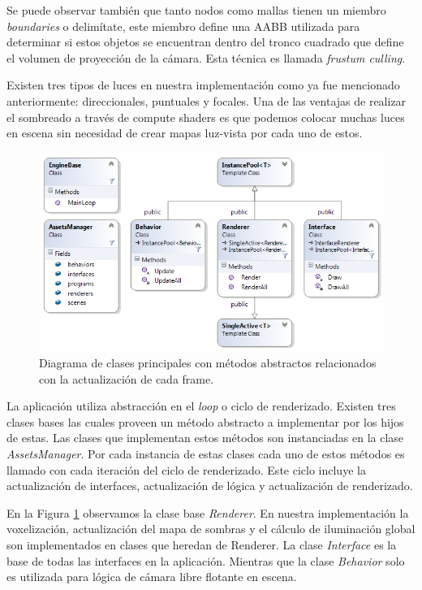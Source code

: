 Se puede observar también que tanto nodos como mallas tienen un miembro \emph{boundaries} o delimítate, este miembro define una \ac{AABB} utilizada para determinar si estos objetos se encuentran dentro del tronco cuadrado que define el volumen de proyección de la cámara. Esta técnica es llamada \emph{frustum culling}. 

Existen tres tipos de luces en nuestra implementación como ya fue mencionado anteriormente: direccionales, puntuales y focales. Una de las ventajas de realizar el sombreado a través de compute shaders es que podemos colocar muchas luces en escena sin necesidad de crear mapas luz-vista por cada uno de estos.

\begin{figure}[H]
	\centering
	\captionsetup{justification=centering}
	\includegraphics[width=\linewidth]{media/ClassDiagram.png}
	\caption{Diagrama de clases principales con métodos abstractos relacionados con la actualización de cada frame.}
	\label{fig:frame_classes}
\end{figure}

La aplicación utiliza abstracción en el \emph{loop} o ciclo de renderizado. Existen tres clases bases las cuales proveen un método abstracto a implementar por los hijos de estas. Las clases que implementan estos métodos son instanciadas en la clase \emph{AssetsManager}. Por cada instancia de estas clases cada uno de estos métodos es llamado con cada iteración del ciclo de renderizado. Este ciclo incluye la actualización de interfaces, actualización de lógica y actualización de renderizado.

En la Figura \ref{fig:frame_classes} observamos la clase base \emph{Renderer}. En nuestra implementación la voxelización, actualización del mapa de sombras y el cálculo de iluminación global son implementados en clases que heredan de Renderer. La clase \emph{Interface} es la base de todas las interfaces en la aplicación. Mientras que la clase \emph{Behavior} solo es utilizada para lógica de cámara libre flotante en escena.

